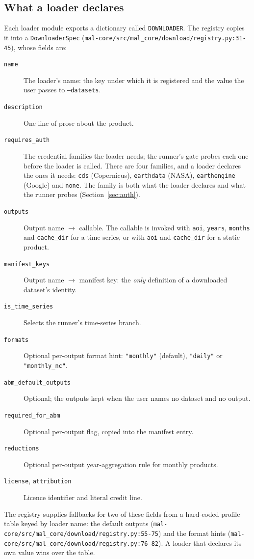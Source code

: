 \documentclass[11pt,a4paper]{article}
\newcommand{\code}[1]{\texttt{#1}}
\begin{document}
\subsection{What a loader declares}

Each loader module exports a dictionary called \code{DOWNLOADER}. The
registry copies it into a \code{DownloaderSpec}
(\code{mal-core/src/mal\_core/download/registry.py:31-45}), whose fields are:

\begin{description}
\item[\code{name}] The loader's name: the key under which it is registered and
the value the user passes to \code{--datasets}.
\item[\code{description}] One line of prose about the product.
\item[\code{requires\_auth}] The credential families the loader needs; the
runner's gate probes each one before the loader is called. There are four
families, and a loader declares the ones it needs: \code{cds}
(Copernicus), \code{earthdata} (NASA), \code{earthengine} (Google) and
\code{none}. The family is both what the loader declares and what the runner
probes (Section~\ref{sec:auth}).
\item[\code{outputs}] Output name $\rightarrow$ callable. The callable is
invoked with \code{aoi}, \code{years}, \code{months} and \code{cache\_dir}
for a time series, or with \code{aoi} and \code{cache\_dir} for a static
product.
\item[\code{manifest\_keys}] Output name $\rightarrow$ manifest key: the
\emph{only} definition of a downloaded dataset's identity.
\item[\code{is\_time\_series}] Selects the runner's time-series branch.
\item[\code{formats}] Optional per-output format hint: \code{"monthly"}
(default), \code{"daily"} or \code{"monthly\_nc"}.
\item[\code{abm\_default\_outputs}] Optional; the outputs kept when the user
names no dataset and no output.
\item[\code{required\_for\_abm}] Optional per-output flag, copied into the
manifest entry.
\item[\code{reductions}] Optional per-output year-aggregation rule for
monthly products.
\item[\code{license}, \code{attribution}] Licence identifier and literal
credit line.
\end{description}

The registry supplies fallbacks for two of these fields from a hard-coded
profile table keyed by loader name: the default outputs
(\code{mal-core/src/mal\_core/download/registry.py:55-75}) and the format hints
(\code{mal-core/src/mal\_core/download/registry.py:76-82}). A loader that
declares its own value wins over the table.
\end{document}
